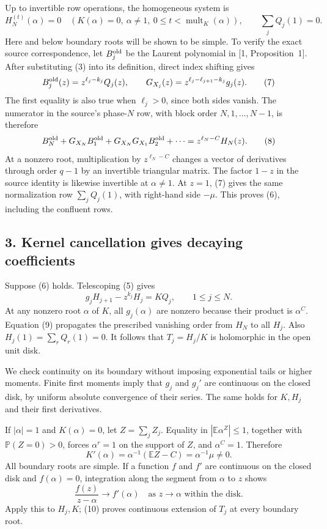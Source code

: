 \documentclass[11pt]{article}
\newcommand{\E}{\mathbb E}
\newcommand{\Pp}{\mathbb P}
\begin{document}
Up to invertible row operations, the homogeneous system is
\[
 H_N^{(t)}(\alpha)=0
 \quad\left(K(\alpha)=0,\ \alpha\ne1,\
                     0\leq t<\operatorname{mult}_K(\alpha)\right),
 \qquad \sum_jQ_j(1)=0.                                    \tag{6}
\]
Here and below boundary roots will be shown to be simple.
To verify the exact source correspondence, let \(B_j^{\rm old}\)
be the Laurent polynomial in [1, Proposition~1].
After substituting (3) into its definition, direct index shifting
gives
\[
 B_j^{\rm old}(z)=z^{\ell_j-k_j}Q_j(z),\qquad
 G_{X_j}(z)=z^{\ell_j-\ell_{j+1}-k_j}g_j(z).                 \tag{7}
\]
The first equality is also true when \(\ell_j>0\), since both
sides vanish. The numerator in the source's phase-\(N\) row,
with block order \(N,1,\ldots,N-1\), is therefore
\[
 B_N^{\rm old}+G_{X_N}B_1^{\rm old}
       +G_{X_N}G_{X_1}B_2^{\rm old}+\cdots
       =z^{\ell_N-C}H_N(z).                                \tag{8}
\]
At a nonzero root, multiplication by \(z^{\ell_N-C}\)
changes a vector of derivatives through order \(q-1\)
by an invertible triangular matrix. The factor \(1-z\)
in the source identity is likewise invertible at \(\alpha\ne1\).
At \(z=1\), (7) gives the same normalization row
\(\sum_jQ_j(1)\), with right-hand side \(-\mu\).
This proves (6), including the confluent rows.

\subsection*{3. Kernel cancellation gives decaying coefficients}
Suppose (6) holds. Telescoping (5) gives
\[
 g_jH_{j+1}-z^{k_j}H_j=KQ_j,\qquad 1\leq j\leq N.
                                                               \tag{9}
\]
At any nonzero root \(\alpha\) of \(K\), all \(g_j(\alpha)\)
are nonzero because their product is \(\alpha^C\).
Equation (9) propagates the prescribed vanishing order from
\(H_N\) to all \(H_j\). Also
\(H_j(1)=\sum_rQ_r(1)=0\).
It follows that \(T_j=H_j/K\) is holomorphic in the open unit disk.

We check continuity on its boundary without imposing exponential
tails or higher moments. Finite first moments imply that \(g_j\)
and \(g_j'\) are continuous on the closed disk, by uniform absolute
convergence of their series. The same holds for \(K,H_j\) and
their first derivatives.

If \(|\alpha|=1\) and \(K(\alpha)=0\), let \(Z=\sum_jZ_j\).
Equality in \(|\E\alpha^Z|\leq1\), together with \(\Pp(Z=0)>0\),
forces \(\alpha^r=1\) on the support of \(Z\), and
\(\alpha^C=1\). Therefore
\[
 K'(\alpha)=\alpha^{-1}(\E Z-C)=\alpha^{-1}\mu\ne0.          \tag{10}
\]
All boundary roots are simple. If a function \(f\) and \(f'\)
are continuous on the closed disk and \(f(\alpha)=0\),
integration along the segment from \(\alpha\) to \(z\) shows
\[
 \frac{f(z)}{z-\alpha}\longrightarrow f'(\alpha)
 \quad\text{as }z\to\alpha\text{ within the disk}.
 \]
Apply this to \(H_j,K\); (10) proves continuous extension
of \(T_j\) at every boundary root.
\end{document}
